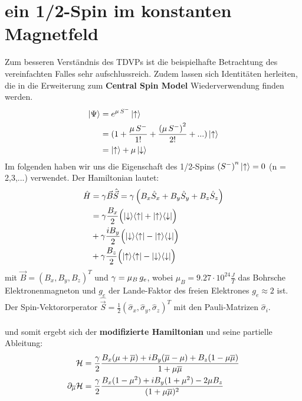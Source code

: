 \section{ein 1/2-Spin im konstanten Magnetfeld}
Zum besseren Verständnis des TDVPs ist die beispielhafte Betrachtung des vereinfachten Falles sehr aufschlussreich. 
Zudem lassen sich Identitäten herleiten, die in die Erweiterung zum \textbf{Central Spin Model} Wiederverwendung finden werden.
\begin{align*}
    \ket{\Psi} &= e^{\mu\thinspace S^-}\ket{\uparrow} \\
            &= (1 + \frac{\mu\thinspace S^{-}}{1!} + \frac{\left(\mu\thinspace S^{-}\right)^2}{2!} + ...)\ket{\uparrow}    \\
            &= \ket{\uparrow} + \mu\ket{\downarrow}
\end{align*}
\noindent Im folgenden haben wir uns die Eigenschaft des 1/2-Spins $\left(S^{-}\right)^{n}\ket{\uparrow}=0$  (n = 2,3,...) verwendet.
Der Hamiltonian lautet:
\begin{align}
    \hat{H} &= \gamma \vec{B}\hat{\vec{S}} = \gamma\left(B_x\hat{S}_x+B_y\hat{S}_y+B_z\hat{S}_z \right) \\
    &= \gamma \frac{B_x}{2}\Bigl(\ket{\downarrow}\!\bra{\uparrow}+\ket{\uparrow}\!\bra{\downarrow}\Bigr) \\
    & + \gamma \frac{iB_y}{2}\Bigl(\ket{\downarrow}\!\bra{\uparrow}-\ket{\uparrow}\!\bra{\downarrow}\Bigr) \\
    & + \gamma \frac{B_z}{2}\Bigl(\ket{\uparrow}\!\bra{\uparrow}-\ket{\downarrow}\!\bra{\downarrow}\Bigr) 
\end{align}
\noindent mit $\vec{B} = (B_x,B_y,B_z)^T$ und $\gamma=\mu_B\thinspace g_e$, wobei $\mu_B = 9.27 \cdot 10^{24} \frac{J}{T}$ das Bohrsche 
Elektronenmagneton und $g_e$ der Lande-Faktor des freien Elektrones $g_e\approx 2$ ist. Der Spin-Vektororperator 
$\hat{\vec{S}}= \frac{1}{2}\left(\hat{\sigma}_x,\hat{\sigma}_y,\hat{\sigma}_z\right)^T$ mit den Pauli-Matrizen $\hat{\sigma}_i$.\\ \\
und somit ergebt sich der \textbf{modifizierte Hamiltonian} und seine partielle Ableitung:
\begin{align}
    \mathcal{H} &= \frac{\gamma}{2}\frac{B_x(\mu +\overline{\mu}) + iB_y(\overline{\mu} - \mu) + B_z(1-\mu\overline{\mu}) }{1+\mu\overline{\mu}}    \\
    \partial_{\overline{\mu}} \mathcal{H} &= \frac{\gamma}{2} \frac{B_x(1-\mu^2) + iB_y(1+\mu^2) - 2\mu B_z}{(1+\mu\overline{\mu})^2} 
\end{align}
